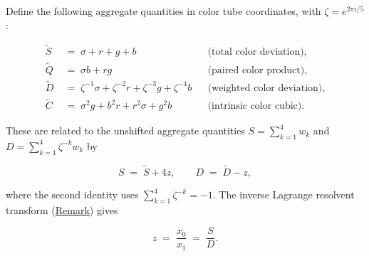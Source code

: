 \begin{remark}
  \label{rem:aggregate-color-quantities}
Define the following aggregate quantities in color tube coordinates,
with $\zeta = e^{2\pi i/5}$:

\begin{align}
  \widetilde{S} &\;=\; \sigma + r + g + b
    &&\text{(total color deviation),}
    \label{eq:agg-S-tilde}\\[4pt]
  \widetilde{Q} &\;=\; \sigma b + r g
    &&\text{(paired color product),}
    \label{eq:agg-Q-tilde}\\[4pt]
  \widetilde{D} &\;=\; \zeta^{-1}\sigma + \zeta^{-2}r + \zeta^{-3}g + \zeta^{-4}b
    &&\text{(weighted color deviation),}
    \label{eq:agg-D-tilde}\\[4pt]
  \widetilde{C} &\;=\; \sigma^2 g + b^2 r + r^2\sigma + g^2 b
    &&\text{(intrinsic color cubic).}
    \label{eq:agg-C-tilde}
\end{align}

These are related to the unshifted aggregate quantities
$S = \sum_{k=1}^{4}w_k$ and $D = \sum_{k=1}^{4}\zeta^{-k}w_k$ by

\begin{equation}\label{eq:aggregate-shift}
  S \;=\; \widetilde{S} + 4z, \qquad D \;=\; \widetilde{D} - z,
\end{equation}

where the second identity uses $\sum_{k=1}^{4}\zeta^{-k} = -1$.
The inverse Lagrange resolvent transform
(\hyperref[rem:lagrange-resolvents]{Remark}) gives

\begin{equation}\label{eq:z-from-SD}
  z \;=\; \frac{x_0}{x_1} \;=\; \frac{S}{D}.
\end{equation}
\end{remark}

